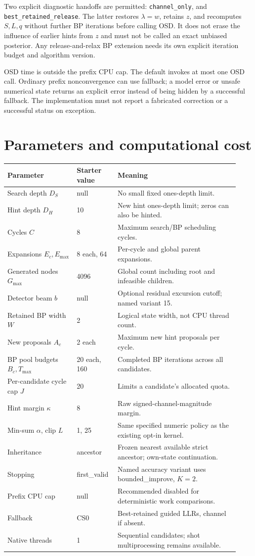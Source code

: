 \documentclass[11pt,a4paper]{article}
\newcommand{\code}[1]{\nolinkurl{#1}}
\begin{document}
Two explicit diagnostic handoffs are permitted: \code{channel_only}, and \code{best_retained_release}. The latter restores $\lambda=w$, retains $z$, and recomputes $S,L,q$ without further BP iterations before calling OSD. It does not erase the influence of earlier hints from $z$ and must not be called an exact unbiased posterior. Any release-and-relax BP extension needs its own explicit iteration budget and algorithm version.

OSD time is outside the prefix CPU cap. The default invokes at most one OSD call. Ordinary prefix nonconvergence can use fallback; a model error or unsafe numerical state returns an explicit error instead of being hidden by a successful fallback. The implementation must not report a fabricated correction or a successful status on exception.

\section{Parameters and computational cost}
\begin{longtable}{p{0.29\linewidth}p{0.15\linewidth}p{0.49\linewidth}}
\toprule Parameter & Starter value & Meaning\\\midrule\endhead
Search depth $D_S$ & null & No small fixed ones-depth limit.\\
Hint depth $D_H$ & 10 & New hint ones-depth limit; zeros can also be hinted.\\
Cycles $C$ & 8 & Maximum search/BP scheduling cycles.\\
Expansions $E_c,E_{\max}$ & 8 each, 64 & Per-cycle and global parent expansions.\\
Generated nodes $G_{\max}$ & 4096 & Global count including root and infeasible children.\\
Detector beam $b$ & null & Optional residual excursion cutoff; named variant 15.\\
Retained BP width $W$ & 2 & Logical state width, not CPU thread count.\\
New proposals $A_c$ & 2 each & Maximum new hint proposals per cycle.\\
BP pool budgets $B_c,T_{\max}$ & 20 each, 160 & Completed BP iterations across all candidates.\\
Per-candidate cycle cap $J$ & 20 & Limits a candidate's allocated quota.\\
Hint margin $\kappa$ & 8 & Raw signed-channel-magnitude margin.\\
Min-sum $\alpha$, clip $L$ & 1, 25 & Same specified numeric policy as the existing opt-in kernel.\\
Inheritance & ancestor & Frozen nearest available strict ancestor; own-state continuation.\\
Stopping & first\_valid & Named accuracy variant uses bounded\_improve, $K=2$.\\
Prefix CPU cap & null & Recommended disabled for deterministic work comparisons.\\
Fallback & CS0 & Best-retained guided LLRs, channel if absent.\\
Native threads & 1 & Sequential candidates; shot multiprocessing remains available.\\\bottomrule
\end{longtable}
\end{document}
